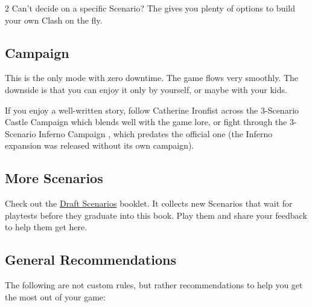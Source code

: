 \begin{multicols*}{2}
Can't decide on a specific Scenario? The  gives you plenty of options to build your own Clash on the fly.

\subsection*{Campaign}

This is the only mode with zero downtime.
The game flows very smoothly.
The downside is that you can enjoy it only by yourself, or maybe with your kids.

If you enjoy a well-written story, follow Catherine Ironfist across the 3-Scenario Castle Campaign  which blends well with the game lore, or fight through the 3-Scenario Inferno Campaign , which predates the official one (the Inferno expansion was released without its own campaign).

\subsection*{More Scenarios}

Check out the \href{https://raw.githubusercontent.com/qwrtln/Homm3BG-mission-book-build-artifacts/drafts/drafts.pdf}{Draft Scenarios} booklet.
It collects new Scenarios that wait for playtests before they graduate into this book.
Play them and share your feedback to help them get here.
\columnbreak

\subsection*{General Recommendations}

The following are not custom rules, but rather recommendations to help you get the most out of your game:


\end{multicols*}
